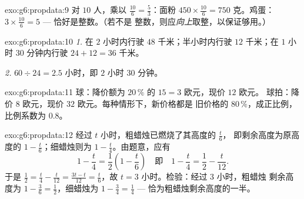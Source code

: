 \begin{solution}{exo:g6:propdata:9}
对 $10$ 人，乘以 $\frac{10}{6} = \frac53$：面粉
$450 \times \frac{10}{6} = 750$ 克。鸡蛋：
$3 \times \frac{10}{6} = 5$ --- 恰好是整数。（若不是
整数，则应\emph{向上}取整，以保证够用。）
\end{solution}

\begin{solution}{exo:g6:propdata:10}
\emph{1.} 在 $2$ 小时内行驶 $48$ 千米；半小时内行驶 $12$ 千米；在
$1$ 小时 $30$ 分钟内行驶 $24 + 12 = 36$ 千米。

\emph{2.} $60 \div 24 = 2.5$ 小时，即 $2$ 小时 $30$ 分钟。
\end{solution}

\begin{solution}{exo:g6:propdata:11}
球：降价额为 $20\,\%$ 的 $15 = 3$ 欧元，现价 $12$ 欧元。
球拍：降价 $8$ 欧元，现价 $32$ 欧元。每种情形下，新价格都是
旧价格的 $80\,\%$，成正比例，比例系数为
$0.8$。
\end{solution}

\begin{solution}{exo:g6:propdata:12}
经过 $t$ 小时，粗蜡烛已燃烧了其高度的 $\frac t6$，
即剩余高度为原高度的 $1 - \frac t6$；细蜡烛则为
$1 - \frac t4$。由题意，应有
\[
1 - \frac t4 = \frac12 \left(1 - \frac t6\right)
\quad\text{即}\quad
1 - \frac t4 = \frac12 - \frac t{12}.
\]
于是 $\frac12 = \frac t4 - \frac t{12} = \frac{3t - t}{12} =
\frac{t}{6}$，故 $t = 3$ 小时。检验：经过 $3$ 小时，粗蜡烛
剩余高度为 $1 - \frac36 = \frac12$，细蜡烛为
$1 - \frac34 = \frac14$ --- 恰为粗蜡烛剩余高度的一半。
\end{solution}

